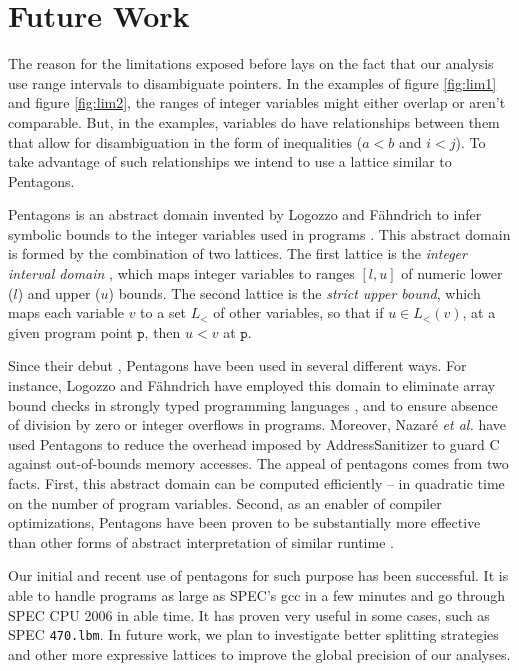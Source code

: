 \documentclass[12pt]{article}
\begin{document}
\section {Future Work}
The reason for the limitations exposed before lays on the fact that our analysis 
use range intervals to disambiguate pointers.
In the examples of figure \ref{fig:lim1} and figure \ref{fig:lim2}, the ranges 
of integer variables might either overlap or aren't comparable. But, in the 
examples, variables do have relationships between them that allow for 
disambiguation in the form of inequalities ($a<b$ and $i<j$). To take advantage 
of such relationships we intend to use a lattice similar to Pentagons.

Pentagons is an abstract domain invented by Logozzo and F\"{a}hndrich
to infer symbolic bounds to the integer variables used in
programs \cite{Logozzo08,Logozzo10}.
This abstract domain is formed by the combination of two
lattices.
The first lattice is the {\em integer interval domain} \cite{Cousot77}, which
maps integer variables to ranges $[l, u]$ of numeric lower ($l$) and upper ($u$)
bounds.
The second lattice is the {\em strict upper bound}, which maps each variable
$v$ to a set $L_<$ of other variables, so that if $u \in L_<(v)$, at a given
program point $\mathtt{p}$, then $u < v$ at $\mathtt{p}$. 

Since their debut \cite{Logozzo08}, Pentagons have been used in several
different ways.
For instance, Logozzo and F\"{a}hndrich have employed this domain to eliminate
array bound checks in strongly typed programming
languages \cite{Logozzo10}, and to ensure absence of division by zero or
integer overflows in programs.
Moreover, Nazar\'{e} {\em et al.} \cite{Nazare14} have used Pentagons to reduce
the overhead imposed by AddressSanitizer \cite{Serebryany12} to guard C against
out-of-bounds memory accesses.
The appeal of pentagons comes from two facts.
First, this abstract domain can be computed efficiently -- in quadratic time on
the number of program variables.
Second, as an enabler of compiler optimizations, Pentagons have been
proven to be substantially more effective than other forms of abstract
interpretation of similar runtime \cite{Logozzo08}.

Our initial and recent use of pentagons for such purpose has been successful. 
It is able to handle programs as large as SPEC's gcc in a few minutes and go
through SPEC CPU 2006 \cite{Henning06} in able time. It has proven very 
useful in some cases, such as SPEC \texttt{470.lbm}.  
In future work, we plan to investigate better splitting strategies
and other more expressive lattices to improve the global precision of
our analyses.
\end{document}
